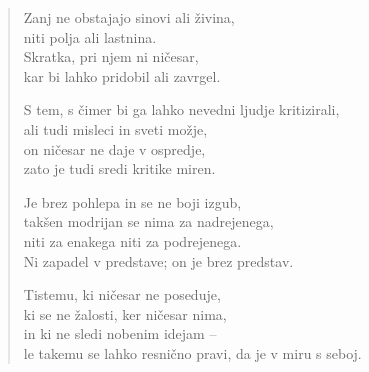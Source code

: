 
\clearpage
\begin{verse}

Zanj ne obstajajo sinovi ali živina,\\
niti polja ali lastnina.\\
Skratka, pri njem ni ničesar,\\
kar bi lahko pridobil ali zavrgel.

S tem, s čimer bi ga lahko nevedni ljudje kritizirali,\\
ali tudi misleci in sveti možje,\\
on ničesar ne daje v ospredje,\\
zato je tudi sredi kritike miren.

Je brez pohlepa in se ne boji izgub,\\
takšen modrijan se nima za nadrejenega,\\
niti za enakega niti za podrejenega.\\
Ni zapadel v predstave; on je brez predstav.

Tistemu, ki ničesar ne poseduje,\\
ki se ne žalosti, ker ničesar nima,\\
in ki ne sledi nobenim idejam --\\
le takemu se lahko resnično pravi, da je v miru s seboj.

\end{verse}

